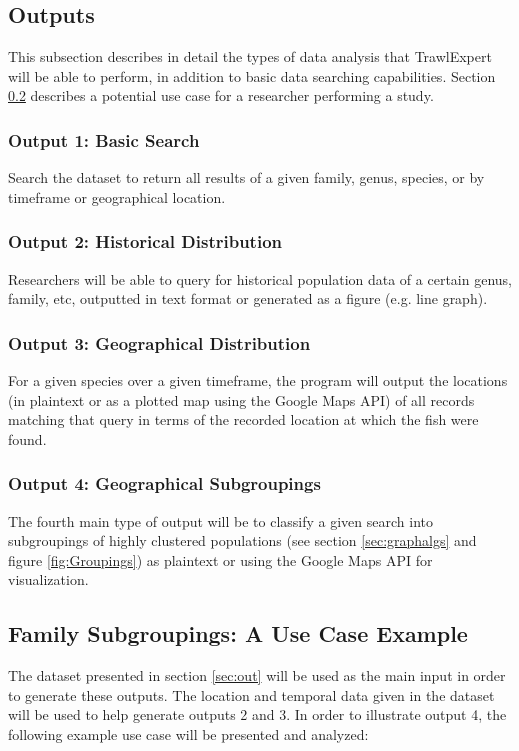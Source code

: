 \documentclass{article}
\begin{document}
\subsection{Outputs}
This subsection describes in detail the types of data analysis that TrawlExpert will be able to perform, in addition to basic data searching capabilities. Section \ref{sec:case} describes a potential use case for a researcher performing a study.

\subsubsection{Output 1: Basic Search}
Search the dataset to return all results of a given family, genus, species, or by timeframe or geographical location.

\subsubsection{Output 2: Historical Distribution}
Researchers will be able to query for historical population data of a certain genus, family, etc, outputted in text format or generated as a figure (e.g. line graph).

\subsubsection{Output 3: Geographical Distribution}
For a given species over a given timeframe, the program will output the locations (in plaintext or as a plotted map using the Google Maps API) of all records matching that query in terms of the recorded location at which the fish were found.

\subsubsection{Output 4: Geographical Subgroupings}\label{sec:subgroup}
The fourth main type of output will be to classify a given search into subgroupings of highly clustered populations (see section \ref{sec:graphalgs} and figure \ref{fig:Groupings}) as plaintext or using the Google Maps API for visualization.

\subsection{Family Subgroupings: A Use Case Example}\label{sec:case}
The dataset presented in section \ref{sec:out} will be used as the main input in order to generate these outputs. The location and temporal data given in the dataset will be used to help generate outputs 2 and 3. In order to illustrate output 4, the following example use case will be presented and analyzed:
\end{document}
